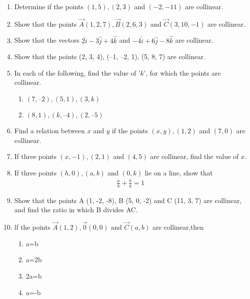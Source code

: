 \begin{enumerate}[label=\thesubsection.\arabic*,ref=\thesubsection.\theenumi]
\item Determine if the points $(1,5),(2,3)$ and $(-2,-11)$ are collinear.
	\\
		
\item Show that the points $\vec{A}(1,2,7), \vec{B}(2,6,3)$ and $\vec{C}(3,10,-1)$ are collinear.
	\\
	\solution
		
\item Show that the vectors $2\hat{i}-3\hat{j}+4\hat{k}$ and $-4\hat{i}+6\hat{j}-8\hat{k}$ are collinear.
   \\ 
    \solution 
		
\item Show that the points (2, 3, 4), (–1, –2, 1), (5, 8, 7) are collinear.
		\\
		\solution
		
\item In each of the following, find the value of '$k$', for which the points are collinear.
\begin{enumerate}
\item $(7, –2), (5, 1), (3, k)$
\item $(8, 1), (k, – 4), (2, –5)$
\end{enumerate}
		\label{10/7/3/2}
\solution
		
\item Find a relation between $x$ and $y$ if the points $(x, y), (1, 2)$  and  $(7, 0)$ are collinear.
\\
\solution
	
\item If three points $(x, -1), (2, 1)$ and $(4, 5)$ are collinear, find the value of $x$.
\label{chapters/11/10/1/8}

\item If three points $(h, 0), (a, b)$ and $(0, k)$ lie on a line, 
show that 
\begin{align}
\frac{a}{h}+\frac{b}{k}=1
\end{align}
\label{chapters/11/10/1/13}

\item Show that the points A (1, -2, -8), B (5, 0, -2) and C (11, 3, 7) are collinear, and find the ratio in which B divides AC.\\
\item lf the points $\vec{A}(1,2),\vec{0}(0,0)\text{ and }\vec{C}(a,b)$ are collinear,then
\begin{enumerate}
\item a=b
\item a=2b
\item 2a=b
\item a=-b
\end{enumerate}
\end{enumerate}
